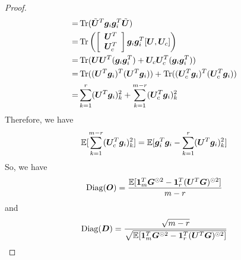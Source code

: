 \begin{proof}
\begin{align*}
        =&\operatorname{Tr}(\tilde{{\bm{U}}}^T{\bm{g}}_i{\bm{g}}_i^T\tilde{{\bm{U}}})\\
        =&\operatorname{Tr}\left(\left[\begin{array}{c}
             {\bm{U}}^T  \\
             {\bm{U}}_c^T
        \end{array}\right]{\bm{g}}_i{\bm{g}}_i^T[{\bm{U}},{\bm{U}}_c]\right)\\
        =& \operatorname{Tr}({\bm{U}}{\bm{U}}^T({\bm{g}}_i{\bm{g}}_i^T)+ {\bm{U}}_c{\bm{U}}_c^T({\bm{g}}_i{\bm{g}}_i^T))\\
        =& \operatorname{Tr}(({\bm{U}}^T{\bm{g}}_i)^T({\bm{U}}^T{\bm{g}}_i)) + \operatorname{Tr}(({\bm{U}}_c^T{\bm{g}}_i)^T({\bm{U}}_c^T{\bm{g}}_i))\\
        =& \sum_{k=1}^r({\bm{U}}^T{\bm{g}}_i)_k^2 + \sum_{k=1}^{m-r} ({\bm{U}}_c^T{\bm{g}}_i)^2_k
    \end{align*}
    Therefore, we have
    \begin{align*}
        \mathbb{E}[\sum_{k=1}^{m-r}({\bm{U}}_c^T{\bm{g}}_i)_k^2] = \mathbb{E}[{\bm{g}}_i^T{\bm{g}}_i-\sum_{k=1}^r ({\bm{U}}^T{\bm{g}}_i)_k^2]
    \end{align*}
    So, we have 
    \begin{align*}
        \operatorname{Diag}({\bm{O}}) = \frac{\mathbb{E}[\bm{1}_m^T{\bm{G}}^{\odot 2} - \bm{1}_r^T({\bm{U}}^T{\bm{G}})^{\odot 2}]}{m-r}
    \end{align*}
    and 
    \begin{align*}
        \operatorname{Diag}({\bm{D}}) = \frac{\sqrt{m-r}}{\sqrt{\mathbb{E}[\bm{1}_m^T{\bm{G}}^{\odot 2} - \bm{1}_r^T({\bm{U}}^T{\bm{G}})^{\odot 2}]}} 
    \end{align*}
    
    
\end{proof}